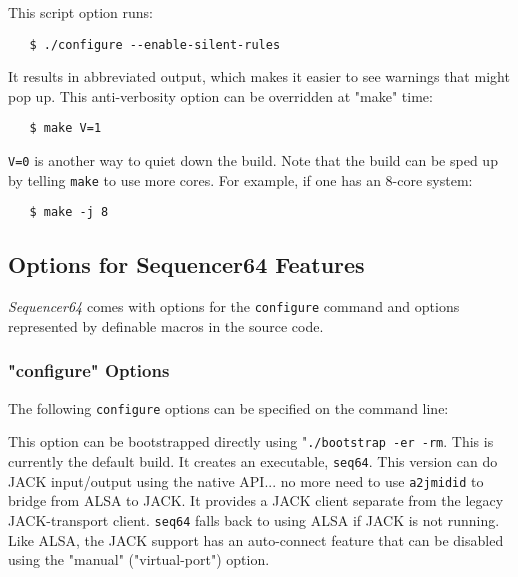    This script option runs:

\begin{verbatim}
   $ ./configure --enable-silent-rules
\end{verbatim}

   It results in abbreviated output, which makes it easier to see
   warnings that might pop up.
   This anti-verbosity option can be overridden at "make" time:

\begin{verbatim}
   $ make V=1
\end{verbatim}

   \texttt{V=0} is another way to quiet down the build.
   Note that the build can be sped up by telling \texttt{make}
   to use more cores.
   For example, if one has an 8-core system:

\begin{verbatim}
   $ make -j 8
\end{verbatim}


\subsection{Options for Sequencer64 Features}
\label{subsec:seq64_build_options}

   \textsl{Sequencer64} comes with options for the \texttt{configure} command
   and options represented by definable macros in the source code.

\subsubsection{"configure" Options}
\label{subsubsec:seq64_build_configure}

   The following \texttt{configure} options can be specified on the command
   line:

   \setcounter{ItemCounter}{0}      %

        This option can be bootstrapped directly using
        "\texttt{./bootstrap -er -rm}.
        This is currently the default build.  It creates
        an executable, \texttt{seq64}.
        This version can do JACK input/output
        using the native API... no more need to use \texttt{a2jmidid} to
        bridge from ALSA to JACK.  It provides a JACK client separate
        from the legacy JACK-transport client. \texttt{seq64}
        falls back to using ALSA if JACK is not running.  
        Like ALSA, the JACK support has an auto-connect feature
        that can be disabled using the "manual" ("virtual-port")
        option.

